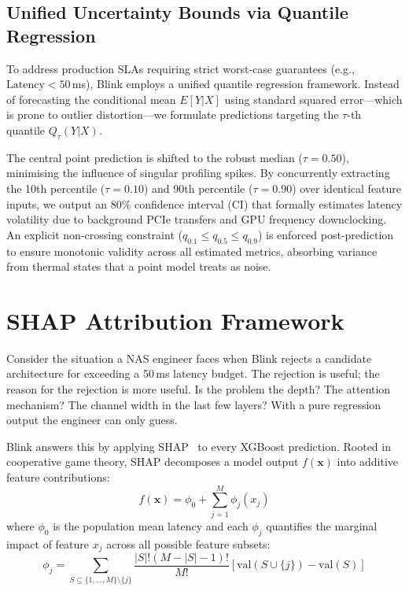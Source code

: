 \documentclass[conference]{IEEEtran}
\begin{document}
\subsection{Unified Uncertainty Bounds via Quantile Regression}

To address production SLAs requiring strict worst-case guarantees
(e.g., $\text{Latency} < 50$\,ms), Blink employs a unified quantile regression
framework. Instead of forecasting the conditional mean $E[Y|X]$ using standard
squared error---which is prone to outlier distortion---we formulate predictions
targeting the $\tau$-th quantile $Q_\tau(Y|X)$.

The central point prediction is shifted to the robust median ($\tau=0.50$),
minimising the influence of singular profiling spikes. By concurrently extracting
the 10th percentile ($\tau=0.10$) and 90th percentile ($\tau=0.90$) over
identical feature inputs, we output an 80\% confidence interval (CI) that
formally estimates latency volatility due to background PCIe transfers and GPU
frequency downclocking. An explicit non-crossing constraint
($q_{0.1} \leq q_{0.5} \leq q_{0.9}$) is enforced post-prediction to ensure
monotonic validity across all estimated metrics, absorbing variance from thermal
states that a point model treats as noise.

\section{SHAP Attribution Framework}

Consider the situation a NAS engineer faces when Blink rejects a candidate
architecture for exceeding a 50\,ms latency budget. The rejection is useful;
the reason for the rejection is more useful. Is the problem the depth? The
attention mechanism? The channel width in the last few layers? With a pure
regression output the engineer can only guess.

Blink answers this by applying SHAP~\cite{lundberg2017unified} to every
XGBoost prediction. Rooted in cooperative game theory, SHAP decomposes
a model output $f(\mathbf{x})$ into additive feature contributions:
\begin{equation}
    f(\mathbf{x}) = \phi_0 + \sum_{j=1}^{M} \phi_j(x_j)
\end{equation}
where $\phi_0$ is the population mean latency and each $\phi_j$ quantifies
the marginal impact of feature $x_j$ across all possible feature subsets:
\begin{equation}
    \phi_j = \sum_{S \subseteq \{1,\dots,M\} \setminus \{j\}}
    \frac{|S|!(M-|S|-1)!}{M!}
    \left[ \text{val}(S \cup \{j\}) - \text{val}(S) \right]
\end{equation}
\end{document}

